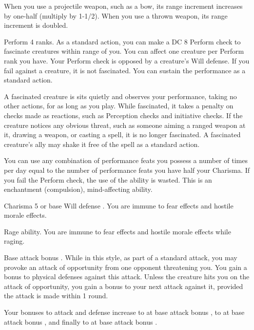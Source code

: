  When you use a projectile weapon, such as a bow, its range increment increases by one-half (multiply by 1-1/2). When you use a thrown weapon, its range increment is doubled.

\featpre Perform 4 ranks.
\featben As a standard action, you can make a DC 8 Perform check to fascinate creatures within \rngmed range of you. You can affect one creature per Perform rank you have. Your Perform check is opposed by a creature's Will defense. If you fail against a creature, it is not fascinated. You can sustain the performance as a standard action.

A fascinated creature is sits quietly and observes your performance, taking no other actions, for as long as you play. While fascinated, it takes a  penalty on checks made as reactions, such as Perception checks and initiative checks. If the creature notices any obvious threat, such as someone aiming a ranged weapon at it, drawing a weapon, or casting a spell, it is no longer fascinated. A fascinated creature's ally may shake it free of the spell as a standard action.

You can use any combination of performance feats you possess a number of times per day equal to the number of performance feats you have \add half your Charisma. If you fail the Perform check, the use of the ability is wasted. This is an enchantment (compulsion), mind-affecting ability.

\featpre Charisma 5 or base Will defense .
\featben You are immune to fear effects and hostile morale effects.

\featpre Rage ability.
\featben You are immune to fear effects and hostile morale effects while raging.

\featpre Base attack bonus .
\featben While in this style, as part of a standard attack, you may provoke an attack of opportunity from one opponent threatening you. You gain a  bonus to physical defenses against this attack. Unless the creature hits you on the attack of opportunity, you gain a  bonus to your next attack against it, provided the attack is made within 1 round.

Your bonuses to attack and defense increase to  at base attack bonus , to  at base attack bonus , and finally to  at base attack bonus .

